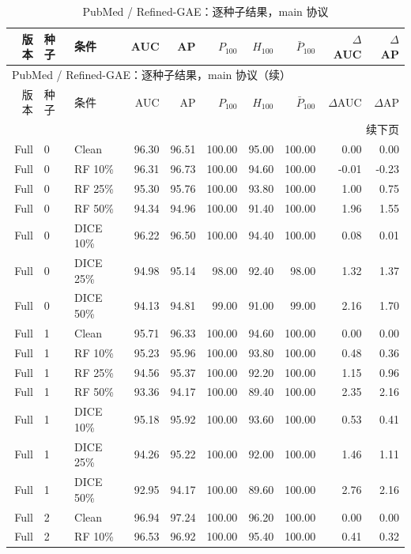 {\footnotesize
\setlength{\tabcolsep}{3.2pt}
\renewcommand{\arraystretch}{1.10}
\begin{longtable}{rllrrrrrrr}
\caption{PubMed / Refined-GAE：逐种子结果，main 协议}\\
\toprule
版本 & 种子 & 条件 & AUC & AP & $P_{100}$ & $H_{100}$ & $\bar P_{100}$ & $\Delta$AUC & $\Delta$AP \\
\midrule
\endfirsthead
\multicolumn{10}{l}{PubMed / Refined-GAE：逐种子结果，main 协议（续）}\\
\toprule
版本 & 种子 & 条件 & AUC & AP & $P_{100}$ & $H_{100}$ & $\bar P_{100}$ & $\Delta$AUC & $\Delta$AP \\
\midrule
\endhead
\midrule\multicolumn{10}{r}{续下页}\\
\endfoot
\bottomrule
\endlastfoot
Full & 0 & Clean & 96.30 & 96.51 & 100.00 & 95.00 & 100.00 & 0.00 & 0.00 \\
Full & 0 & RF 10\% & 96.31 & 96.73 & 100.00 & 94.60 & 100.00 & -0.01 & -0.23 \\
Full & 0 & RF 25\% & 95.30 & 95.76 & 100.00 & 93.80 & 100.00 & 1.00 & 0.75 \\
Full & 0 & RF 50\% & 94.34 & 94.96 & 100.00 & 91.40 & 100.00 & 1.96 & 1.55 \\
Full & 0 & DICE 10\% & 96.22 & 96.50 & 100.00 & 94.40 & 100.00 & 0.08 & 0.01 \\
Full & 0 & DICE 25\% & 94.98 & 95.14 & 98.00 & 92.40 & 98.00 & 1.32 & 1.37 \\
Full & 0 & DICE 50\% & 94.13 & 94.81 & 99.00 & 91.00 & 99.00 & 2.16 & 1.70 \\
Full & 1 & Clean & 95.71 & 96.33 & 100.00 & 94.60 & 100.00 & 0.00 & 0.00 \\
Full & 1 & RF 10\% & 95.23 & 95.96 & 100.00 & 93.80 & 100.00 & 0.48 & 0.36 \\
Full & 1 & RF 25\% & 94.56 & 95.37 & 100.00 & 92.20 & 100.00 & 1.15 & 0.96 \\
Full & 1 & RF 50\% & 93.36 & 94.17 & 100.00 & 89.40 & 100.00 & 2.35 & 2.16 \\
Full & 1 & DICE 10\% & 95.18 & 95.92 & 100.00 & 93.60 & 100.00 & 0.53 & 0.41 \\
Full & 1 & DICE 25\% & 94.26 & 95.22 & 100.00 & 92.00 & 100.00 & 1.46 & 1.11 \\
Full & 1 & DICE 50\% & 92.95 & 94.17 & 100.00 & 89.60 & 100.00 & 2.76 & 2.16 \\
Full & 2 & Clean & 96.94 & 97.24 & 100.00 & 96.20 & 100.00 & 0.00 & 0.00 \\
Full & 2 & RF 10\% & 96.53 & 96.92 & 100.00 & 95.40 & 100.00 & 0.41 & 0.32 \\

\end{longtable}}

